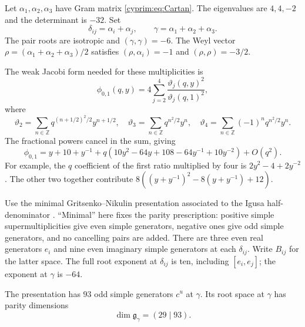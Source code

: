 Let $\alpha_1,\alpha_2,\alpha_3$ have Gram matrix
\eqref{cyprim:eq:Cartan}. The eigenvalues are $4,4,-2$ and
the determinant is $-32$. Set
\[
 \delta_{ij}=\alpha_i+\alpha_j,
 \qquad \gamma=\alpha_1+\alpha_2+\alpha_3.
\]
The pair roots are isotropic and $(\gamma,\gamma)=-6$.
The Weyl vector $\rho=(\alpha_1+\alpha_2+\alpha_3)/2$
satisfies $(\rho,\alpha_i)=-1$ and $(\rho,\rho)=-3/2$.

The weak Jacobi form needed for these multiplicities is
\[
 \phi_{0,1}(q,y)
  =4\sum_{j=2}^4\frac{\vartheta_j(q,y)^2}{\vartheta_j(q,1)^2},
\]
where
\[
 \vartheta_2=\sum_{n\in\mathbb Z}q^{(n+1/2)^2/2}y^{n+1/2},
 \quad \vartheta_3=\sum_{n\in\mathbb Z}q^{n^2/2}y^n,
 \quad \vartheta_4=\sum_{n\in\mathbb Z}(-1)^nq^{n^2/2}y^n.
\]
The fractional powers cancel in the sum, giving
\begin{equation}\label{cyprim:eq:Jacobi-seed}
 \phi_{0,1}=y+10+y^{-1}
 +q(10y^2-64y+108-64y^{-1}+10y^{-2})+O(q^2).
\end{equation}
For example, the $q$ coefficient of the first ratio multiplied
by four is $2y^2-4+2y^{-2}$. The other two together contribute
$8((y+y^{-1})^2-8(y+y^{-1})+12)$.

Use the minimal Gritsenko--Nikulin presentation associated to
the Igusa half-denominator \cite[\S\S~2--3]{GN97}.
``Minimal'' here fixes the parity prescription: positive simple
supermultiplicities give even simple generators, negative ones
give odd simple generators, and no cancelling pairs are added.
There are three even real generators $e_i$ and nine even
imaginary simple generators at each $\delta_{ij}$. Write
$B_{ij}$ for the latter space. The full root exponent at
$\delta_{ij}$ is ten, including $[e_i,e_j]$; the exponent
at $\gamma$ is $-64$.

\begin{proposition}\label{cyprim:prop:root-parity}
The presentation has $93$ odd simple generators $c^u$ at
$\gamma$. Its root space at $\gamma$ has parity dimensions
\begin{equation}\label{cyprim:eq:root-parity}
 \dim\mathfrak g_\gamma=(29\mid93).
\end{equation}
\end{proposition}

